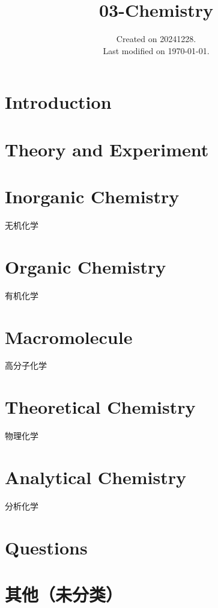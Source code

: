 \documentclass[UTF8]{03-Chemistry}
\begin{document}
\title{03-Chemistry}
\date{Created on 20241228.\\   Last modified on \today.}
\maketitle
\tableofcontents

\chapter{Introduction}



\chapter{Theory and Experiment}


\chapter{Inorganic Chemistry}
无机化学


\chapter{Organic Chemistry}
有机化学


\chapter{Macromolecule}
高分子化学


\chapter{Theoretical Chemistry}
物理化学


\chapter{Analytical  Chemistry}

分析化学

\chapter{Questions}

\chapter{其他（未分类）}
\end{document}
